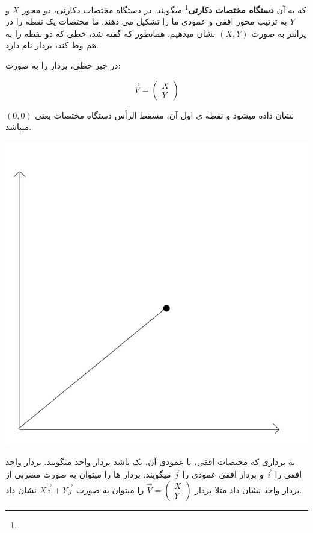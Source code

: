 \documentclass[14pt,a4paper]{memoir}
\begin{document}
	 که به آن \textbf{دستگاه مختصات دکارتی}\footnote{} میگویند. در دستگاه مختصات دکارتی، دو محور $ X $ و $ Y $ به ترتیب محور افقی و عمودی ما را تشکیل می دهند. ما مختصات یک نقطه را در پرانتز به صورت $ (X, Y) $ نشان میدهیم. همانطور که گفته شد، خطی که دو نقطه را به هم وط کند، بردار نام دارد.
	 
	 در جبر خطی، بردار را به صورت:
	 
	 \[\vec{V} = \begin{pmatrix}
	 X \\ Y
	 \end{pmatrix}
	 \] 
	 
	 نشان داده میشود و نقطه ی اول آن، مسقط الرأس دستگاه مختصات یعنی $ (0, 0) $ میباشد. 
	 
	 \begin{center}
	 	 \includegraphics[scale=0.9]{LinAlgVec}
	 \end{center}
	
	به برداری که مختصات افقی، یا عمودی آن، یک باشد بردار واحد میگویند. بردار واحد افقی را $ \vec{i} $ و بردار افقی عمودی را $ \vec{j} $ میگویند. بردار ها را میتوان به صورت مضربی از بردار واحد نشان داد مثلا بردار $ \vec{V} = \begin{pmatrix}
	X \\ Y
	\end{pmatrix}$ را میتوان به صورت $ X\vec{i} + Y\vec{j} $ نشان داد. 
	
\end{document}
